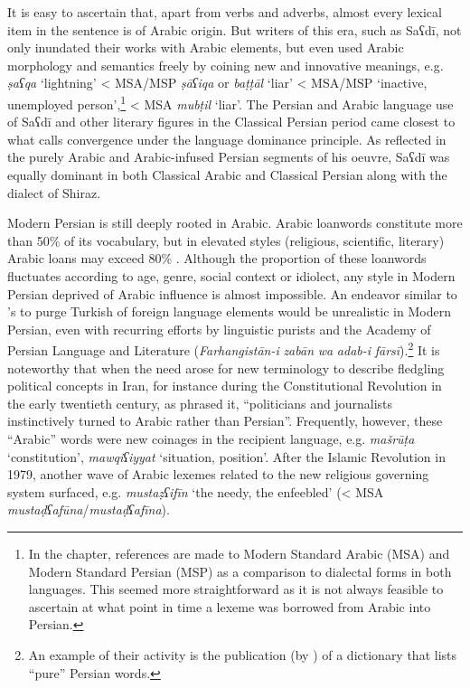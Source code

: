 \documentclass[output=paper]{langsci/langscibook}
\begin{document}
It is easy to ascertain that, apart from verbs and adverbs, almost every lexical item in the sentence is of Arabic origin. But writers of this era, such as Saʕdī, not only inundated their works with Arabic elements, but even used Arabic morphology and semantics freely by coining new and innovative meanings, e.g. \textit{ṣaʕqa} ‘lightning’ < MSA/MSP \textit{ṣāʕiqa} or \textit{baṭṭāl} ‘liar’ < MSA/MSP ‘inactive, unemployed person’,\footnote{In the chapter, references are made to Modern Standard Arabic (MSA) and Modern Standard Persian (MSP) as a comparison to dialectal forms in both languages. This seemed more straightforward as it is not always feasible to ascertain at what point in time a lexeme was borrowed from Arabic into Persian.} < MSA \textit{mubṭil} ‘liar’. The Persian and Arabic language use of Saʕdī and other literary figures in the Classical Persian period came closest to what \citet{Lucas2015} calls convergence under the language dominance principle. As reflected in the purely Arabic and Arabic-infused Persian segments of his oeuvre, Saʕdī was equally dominant in both Classical Arabic and Classical Persian along with the dialect of Shiraz.

Modern Persian is still deeply rooted in Arabic. Arabic loanwords constitute more than 50\% of its vocabulary, but in elevated styles (religious, scientific, literary) Arabic loans may exceed 80\% \citep{Jeremiás2011}. Although the proportion of these loanwords fluctuates according to age, genre, social context or idiolect, any style in Modern Persian deprived of Arabic influence is almost impossible. An endeavor similar to ’s to purge Turkish of foreign language elements would be unrealistic in Modern Persian, even with recurring efforts by linguistic purists and the Academy of Persian Language and Literature (\textit{Farhangistān-i} \textit{zabān} \textit{wa} \textit{adab-i} \textit{fārsī}).\footnote{An example of their activity is the publication (by \citealt{Rāzī2004}) of a dictionary that lists “pure” Persian words.} It is noteworthy that when the need arose for new terminology to describe fledgling political concepts in Iran, for instance during the Constitutional Revolution in the early twentieth\textsuperscript{} century, as \citet{Elwell-Sutton2000} phrased it, “politicians and journalists instinctively turned to Arabic rather than Persian”. Frequently, however, these “Arabic” words were new coinages in the recipient language, e.g. \textit{mašrūṭa} ‘constitution’, \textit{mawqiʕiyyat} ‘situation, position’. After the Islamic Revolution in 1979, another wave of Arabic lexemes related to the new religious governing system surfaced, e.g. \textit{mustaẓʕifīn} ‘the needy, the enfeebled’ (< MSA \textit{mustaḍʕafūna}\kern 0.5pt/\kern -1pt\textit{mustaḍʕafīna}).
\end{document}
